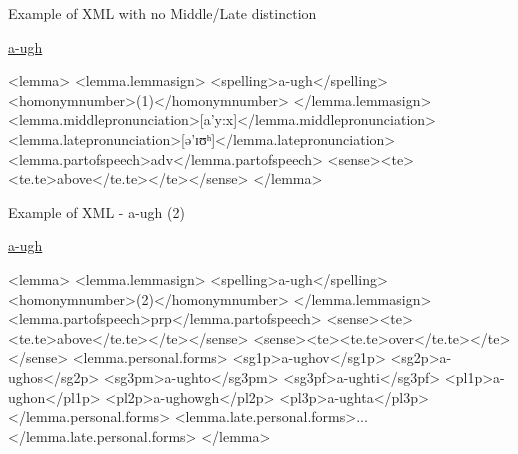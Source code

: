 \documentclass{beamer}
\begin{document}
\begin{frame}[fragile]{Example of XML with no Middle/Late distinction}
\begin{scriptsize}
\href{http://www.cornishdictionary.org.uk/?locale=en#a-ugh}{a-ugh}
\begin{semiverbatim}
\color{gray}
<lemma>
<lemma.lemmasign>
<spelling>{\color{black}a-ugh}</spelling>
<homonymnumber>{\color{black}(1)}</homonymnumber>
</lemma.lemmasign>
<lemma.middlepronunciation>[a'y:x]</lemma.middlepronunciation>
<lemma.latepronunciation>[ə'ɪʊʰ]</lemma.latepronunciation>
<lemma.partofspeech>{\color{black}adv}</lemma.partofspeech>
<sense><te><te.te>{\color{black}above}</te.te></te></sense>
</lemma>
\end{semiverbatim}
\end{scriptsize}
\end{frame}
\begin{frame}[fragile]{Example of XML - a-ugh (2)}
\begin{tiny}
\href{http://www.cornishdictionary.org.uk/?locale=en#a-ugh}{a-ugh}
\begin{semiverbatim}
\color{gray}
<lemma>
<lemma.lemmasign>
<spelling>{\color{black}a-ugh}</spelling>
<homonymnumber>{\color{black}(2)}</homonymnumber>
</lemma.lemmasign>
<lemma.partofspeech>{\color{black}prp}</lemma.partofspeech>
<sense><te><te.te>{\color{black}above}</te.te></te></sense>
<sense><te><te.te>{\color{black}over}</te.te></te></sense>
<lemma.personal.forms>
<sg1p>a-ughov</sg1p>
<sg2p>a-ughos</sg2p>
<sg3pm>a-ughto</sg3pm>
<sg3pf>a-ughti</sg3pf>
<pl1p>a-ughon</pl1p>
<pl2p>a-ughowgh</pl2p>
<pl3p>a-ughta</pl3p>
</lemma.personal.forms>
<lemma.late.personal.forms>...</lemma.late.personal.forms>
</lemma>
\end{semiverbatim}
\end{tiny}
\end{frame}
\end{document}
